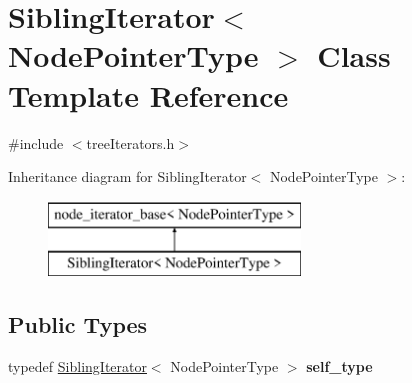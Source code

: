 \hypertarget{classSiblingIterator}{}\section{Sibling\+Iterator$<$ Node\+Pointer\+Type $>$ Class Template Reference}
\label{classSiblingIterator}


{\ttfamily \#include $<$tree\+Iterators.\+h$>$}

Inheritance diagram for Sibling\+Iterator$<$ Node\+Pointer\+Type $>$\+:\begin{figure}[H]
\begin{center}
\leavevmode
\includegraphics[height=2.000000cm]{classSiblingIterator}
\end{center}
\end{figure}
\subsection*{Public Types}
\begin{DoxyCompactItemize}
\item 
\mbox{\label{classSiblingIterator_a456337212cd906f0ee1e5fb755d52b66}} 
typedef \mbox{\hyperlink{classSiblingIterator}{Sibling\+Iterator}}$<$ Node\+Pointer\+Type $>$ {\bfseries self\+\_\+type}
\end{DoxyCompactItemize}
